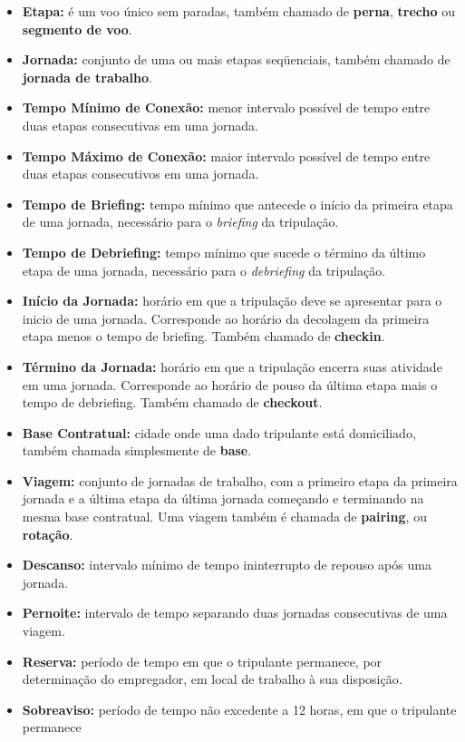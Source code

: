 \documentclass[12pt,a4paper]{article}
\begin{document}
\begin{itemize}
	\item {\bf Etapa:} é um voo único sem paradas, também chamado de {\bf perna}, {\bf trecho} ou {\bf 
	segmento de voo}.
	\item {\bf Jornada:} conjunto de uma ou mais etapas seqüenciais, também chamado de {\bf jornada 
	de trabalho}. 
	\item {\bf Tempo Mínimo de Conexão:} menor intervalo possível de tempo entre duas etapas 
	consecutivas em uma jornada.
	\item {\bf Tempo Máximo de Conexão:} maior intervalo possível de tempo entre duas etapas 
	consecutivos em uma jornada.
	\item {\bf Tempo de Briefing:} tempo mínimo que antecede o início da primeira etapa de uma
	jornada, necessário para o {\it briefing} da tripulação.
	\item {\bf Tempo de Debriefing:} tempo mínimo que sucede o término da último etapa de uma jornada,
	necessário para o {\it debriefing} da tripulação.
	\item {\bf Início da Jornada:} horário em que a tripulação deve se apresentar para o inicio de
	uma jornada. Corresponde ao horário da decolagem da primeira etapa menos o tempo de briefing. 
	Também chamado de {\bf checkin}.
	\item {\bf Término da Jornada:} horário em que a tripulação encerra suas atividade em uma 
	jornada. Corresponde ao horário de pouso da última etapa mais o tempo de debriefing.
	Também chamado de {\bf checkout}.
	\item {\bf Base Contratual:} cidade onde uma dado tripulante está domiciliado, também chamada 
	simplesmente de {\bf base}.
	\item {\bf Viagem:} conjunto de jornadas de trabalho, com a primeiro etapa da primeira jornada e
	a última etapa da última jornada começando e terminando na mesma base contratual. 
	Uma viagem também é chamada de {\bf pairing}, ou {\bf rotação}.
	\item {\bf Descanso:} intervalo mínimo de tempo ininterrupto de repouso após uma jornada.
	\item {\bf Pernoite:} intervalo de tempo separando duas jornadas consecutivas de uma viagem.
	\item {\bf Reserva:} período de tempo em que o tripulante permanece, por determinação do 
	empregador, em local de trabalho à sua disposição.
	\item {\bf Sobreaviso:} período de tempo não excedente a 12 horas, em que o tripulante permanece 

\end{itemize}
\end{document}

